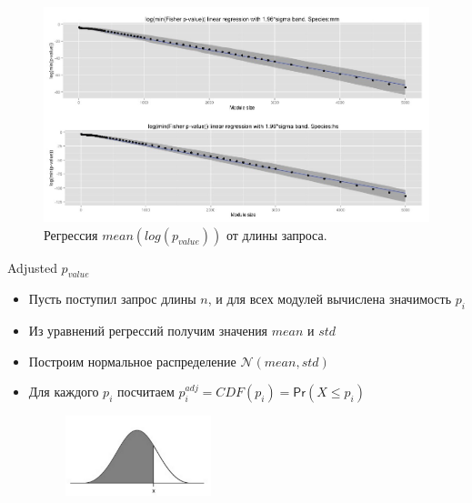 \documentclass[10pt,pdf,utf8,russian,aspectratio=169]{beamer}
\begin{document}
\begin{frame}
    \begin{figure}[!ht]
        \centering
        \caption{Регрессия $mean(log(p_{value}))$ от длины запроса.}
        \includegraphics[width=\textwidth]{./img/mean_linear_regression_with_confidence.jpeg}
    \end{figure}
\end{frame}

\begin{frame}{Adjusted $p_{value}$}
  \begin{itemize}[<+->]
    \item Пусть поступил запрос длины $n$, и для всех модулей вычислена значимость $p_i$
    \item Из уравнений регрессий получим значения $mean$ и $std$
    \item Построим нормальное распределение $\mathcal{N}(mean, std)$
    \item Для каждого $p_i$ посчитаем $p^{adj}_i = CDF(p_i) = \mathsf{Pr}(X \le p_i)$ 
        \begin{figure}[!ht]
        \centering
        \includegraphics[width=0.4\textwidth]{./img/bell.png}
    \end{figure}
  \end{itemize}
\end{frame}
\end{document}
